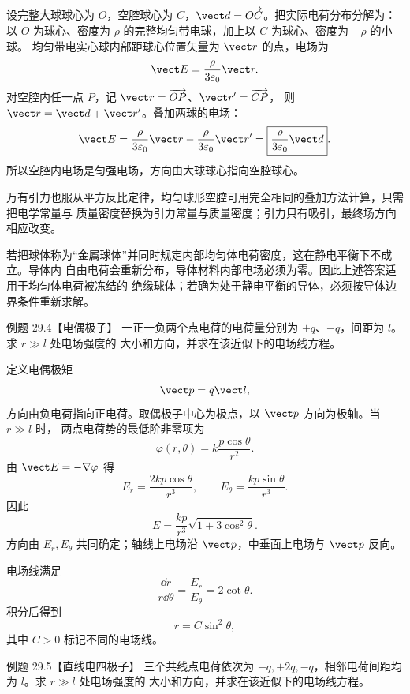 \begin{xesolution}
设完整大球球心为 $O$，空腔球心为 $C$，$\vect d=\overrightarrow{OC}$。把实际电荷分布分解为：
以 $O$ 为球心、密度为 $\rho$ 的完整均匀带电球，加上以 $C$ 为球心、密度为 $-\rho$ 的小球。
均匀带电实心球内部距球心位置矢量为 $\vect r$ 的点，电场为
\[
  \vect E=\frac{\rho}{3\varepsilon_0}\vect r.
\]
对空腔内任一点 $P$，记 $\vect r=\overrightarrow{OP}$、$\vect r'=\overrightarrow{CP}$，
则 $\vect r=\vect d+\vect r'$。叠加两球的电场：
\[
  \vect E=\frac{\rho}{3\varepsilon_0}\vect r
  -\frac{\rho}{3\varepsilon_0}\vect r'
  =\boxed{\frac{\rho}{3\varepsilon_0}\vect d}.
\]
所以空腔内电场是匀强电场，方向由大球球心指向空腔球心。

万有引力也服从平方反比定律，均匀球形空腔可用完全相同的叠加方法计算，只需把电学常量与
质量密度替换为引力常量与质量密度；引力只有吸引，最终场方向相应改变。

若把球体称为“金属球体”并同时规定内部均匀体电荷密度，这在静电平衡下不成立。导体内
自由电荷会重新分布，导体材料内部电场必须为零。因此上述答案适用于均匀体电荷被冻结的
绝缘球体；若确为处于静电平衡的导体，必须按导体边界条件重新求解。
\end{xesolution}

\Needspace{0.35\textheight}
\begin{origexamplebox}{例题 29.4【电偶极子】}
一正一负两个点电荷的电荷量分别为 $+q$、$-q$，间距为 $l$。求 $r\gg l$ 处电场强度的
大小和方向，并求在该近似下的电场线方程。
\dipoleDiagram
\end{origexamplebox}

\begin{xesolution}
定义电偶极矩
\[
  \vect p=q\vect l,
\]
方向由负电荷指向正电荷。取偶极子中心为极点，以 $\vect p$ 方向为极轴。当 $r\gg l$ 时，
两点电荷势的最低阶非零项为
\[
  \varphi(r,\theta)=k\frac{p\cos\theta}{r^2}.
\]
由 $\vect E=-\nabla\varphi$ 得
\[
  \boxed{E_r=\frac{2kp\cos\theta}{r^3}},
  \qquad
  \boxed{E_\theta=\frac{kp\sin\theta}{r^3}}.
\]
因此
\[
  \boxed{E=\frac{kp}{r^3}\sqrt{1+3\cos^2\theta}}.
\]
方向由 $E_r,E_\theta$ 共同确定；轴线上电场沿 $\vect p$，中垂面上电场与 $\vect p$ 反向。

电场线满足
\[
  \frac{\dd r}{r\dd\theta}=\frac{E_r}{E_\theta}=2\cot\theta.
\]
积分后得到
\[
  \boxed{r=C\sin^2\theta},
\]
其中 $C>0$ 标记不同的电场线。
\end{xesolution}

\Needspace{0.35\textheight}
\begin{origexamplebox}{例题 29.5【直线电四极子】}
三个共线点电荷依次为 $-q,+2q,-q$，相邻电荷间距均为 $l$。求 $r\gg l$ 处电场强度的
大小和方向，并求在该近似下的电场线方程。
\quadrupoleDiagram
\end{origexamplebox}

